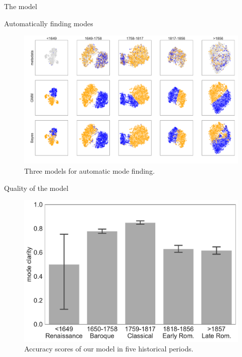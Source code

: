\begin{frame}{The model}
    
\end{frame}

\begin{frame}{Automatically finding modes}
    \begin{figure}
        \includegraphics[width=\linewidth,height=.8\textheight,keepaspectratio]{img/Figure4.pdf}
        \caption{Three models for automatic mode finding.}
    \end{figure}
\end{frame}

\begin{frame}{Quality of the model}
    \begin{figure}
        \includegraphics[width=\linewidth,height=.7\textheight,keepaspectratio]{img/Figure5.pdf}
        \caption{Accuracy scores of our model in five historical periods.}
    \end{figure}
\end{frame}

